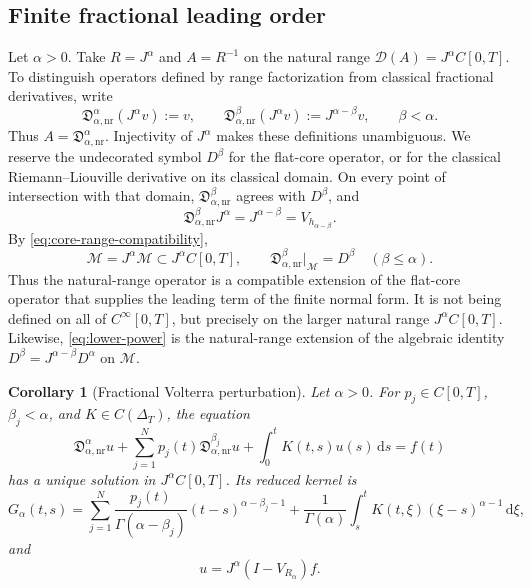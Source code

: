 \documentclass[11pt]{article}
\numberwithin{equation}{section}
\newtheorem{corollary}{Corollary}
\theoremstyle{definition}
\theoremstyle{remark}
\newcommand{\M}{\mathcal M}
\newcommand{\D}{\mathcal D}
\newcommand{\dd}{\,\mathrm d}
\begin{document}
\subsection{Finite fractional leading order}

Let $\alpha>0$. Take $R=J^\alpha$ and $A=R^{-1}$ on the natural range $\D(A)=J^\alpha C[0,T]$. To distinguish operators defined by range factorization from classical fractional derivatives, write
\begin{equation*}
\mathfrak D_{\alpha,\mathrm{nr}}^\alpha(J^\alpha v):=v,
\qquad
\mathfrak D_{\alpha,\mathrm{nr}}^\beta(J^\alpha v):=J^{\alpha-\beta}v,
\qquad \beta<\alpha.
\end{equation*}
Thus $A=\mathfrak D_{\alpha,\mathrm{nr}}^\alpha$. Injectivity of $J^\alpha$ makes these definitions unambiguous. We reserve the undecorated symbol $D^\beta$ for the flat-core operator, or for the classical Riemann--Liouville derivative on its classical domain. On every point of intersection with that domain, $\mathfrak D_{\alpha,\mathrm{nr}}^\beta$ agrees with $D^\beta$, and
\begin{equation}
\mathfrak D_{\alpha,\mathrm{nr}}^\beta J^\alpha
=J^{\alpha-\beta}=V_{h_{\alpha-\beta}}.
\label{eq:lower-power}
\end{equation}
By \eqref{eq:core-range-compatibility},
\begin{equation*}
\M=J^\alpha\M\subset J^\alpha C[0,T],
\qquad
\mathfrak D_{\alpha,\mathrm{nr}}^\beta|_{\M}=D^\beta
\quad(\beta\le\alpha).
\end{equation*}
Thus the natural-range operator is a compatible extension of the flat-core
operator that supplies the leading term of the finite normal form.  It is not
being defined on all of $C^\infty[0,T]$, but precisely on the larger natural
range $J^\alpha C[0,T]$.  Likewise, \eqref{eq:lower-power} is the
natural-range extension of the algebraic identity
$D^\beta=J^{\alpha-\beta}D^\alpha$ on $\M$.

\begin{corollary}[Fractional Volterra perturbation]\label{cor:fractional}
Let $\alpha>0$. For $p_j\in C[0,T]$, $\beta_j<\alpha$, and $K\in C(\Delta_T)$, the equation
\begin{equation}
\mathfrak D_{\alpha,\mathrm{nr}}^\alpha u
+\sum_{j=1}^{N}p_j(t)\mathfrak D_{\alpha,\mathrm{nr}}^{\beta_j}u
+\int_0^tK(t,s)u(s)\dd s=f(t)
\label{eq:fractional-equation}
\end{equation}
has a unique solution in $J^\alpha C[0,T]$. Its reduced kernel is
\begin{equation}
G_\alpha(t,s)
=\sum_{j=1}^{N}\frac{p_j(t)}{\Gamma(\alpha-\beta_j)}(t-s)^{\alpha-\beta_j-1}
+\frac1{\Gamma(\alpha)}\int_s^tK(t,\xi)(\xi-s)^{\alpha-1}\dd\xi,
\end{equation}
and
\begin{equation}
u=J^\alpha(I-V_{R_\alpha})f.
\end{equation}
\end{corollary}
\end{document}
